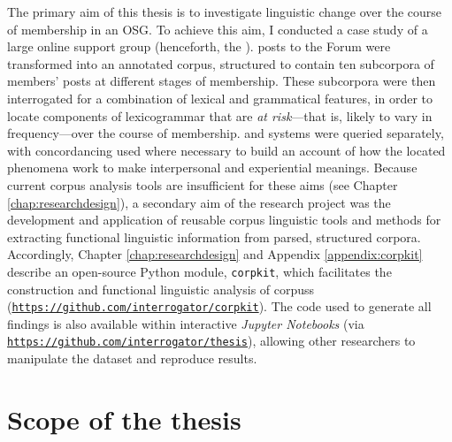 The primary aim of this thesis is to investigate linguistic change over the course of membership in an \gls{OSG}. To achieve this aim, I conducted a case study of a large online  support group (henceforth, the \emph{}). \Glspl{post} to the \gls{Forum} were transformed into an annotated \gls{corpus}, structured to contain ten subcorpora of \glspl{member}' \glspl{post} at different stages of membership. These subcorpora were then interrogated for a combination of lexical and grammatical features, in order to locate components of \gls{lexicogrammar} that are \emph{at risk}---that is, likely to vary in frequency---over the course of membership.  and  systems were queried separately, with concordancing used where necessary to build an account of how the located  phenomena work to make interpersonal and experiential meanings. Because current corpus analysis tools are insufficient for these aims (see Chapter \ref{chap:researchdesign}), a secondary aim of the research project was the development and application of reusable corpus linguistic tools and methods for extracting functional linguistic information from parsed, structured corpora. Accordingly, Chapter \ref{chap:researchdesign} and Appendix \ref{appendix:corpkit} describe an open\hyp{}source Python module, \texttt{corpkit}, which facilitates the construction and functional linguistic analysis of \glspl{corpus} (\texttt{\url{https://github.com/interrogator/corpkit}}). The code used to generate all findings is also available within interactive \emph{Jupyter Notebooks} (via \texttt{\url{https://github.com/interrogator/thesis}}), allowing other researchers to manipulate the dataset and reproduce results.

\section{Scope of the thesis}

